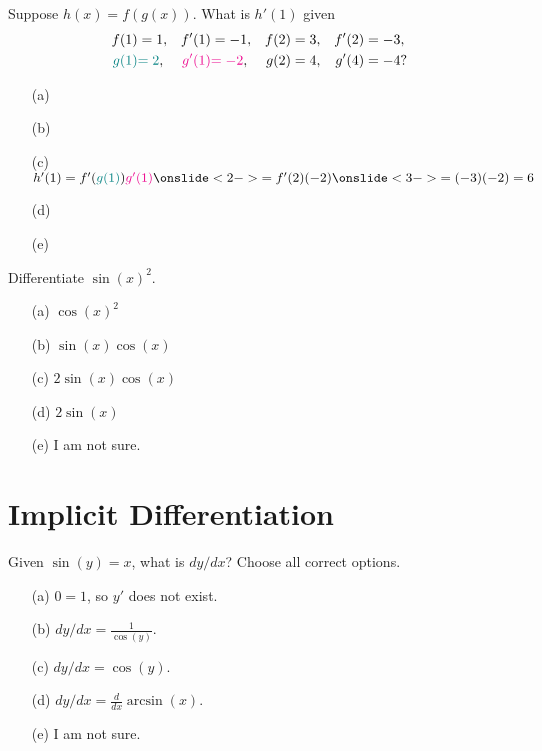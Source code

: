 \documentclass[14pt]{beamer}
\begin{document}
\begin{frame}
  Suppose \(h(x) = f(g(x))\). What is \(h'(1)\) given
  \begin{align*}
    f(1) &= 1,& f'(1) &= -1, &f(2) &= 3, & f'(2) &= -3, \\
    {\color{teal}g(1)} &{\color{teal}= 2},& {\color{magenta}g'(1)} &{\color{magenta}= -2}, &g(2) &= 4, & g'(4) &= -4?
  \end{align*}

  \medskip
  \begin{itemize} \setlength\itemsep{2ex}
    \item[(a)] 
    \item[(b)] 
    \item[(c)] \(h'(1) = f'({\color{teal}g(1)}){\color{magenta}g'(1)} \onslide<2->{= f'(2)(-2)} \onslide<3->{= (-3)(-2) = 6}\)
    \item[(d)] 
    \item[(e)] 
  \end{itemize} 
\end{frame}
\begin{frame}
  Differentiate \(\sin(x)^{2}\).

  \medskip
  \begin{itemize} \setlength\itemsep{2ex}
    \item[(a)] \(\cos(x)^{2}\)
    \item[(b)] \(\sin(x)\cos(x)\)
    \item[(c)] \(2\sin(x)\cos(x)\)
    \item[(d)] \(2\sin(x)\)
    \item[(e)] I am not sure.
  \end{itemize} 
\end{frame}


\section{Implicit Differentiation}
\begin{frame}
  Given \(\sin(y) = x\), what is \(dy/dx\)? Choose all correct options.

  \medskip
  \begin{itemize} \setlength\itemsep{2ex}
    \item[(a)] \(0 = 1\), so \(y'\) does not exist.
    \item[(b)] \(dy/dx = \tfrac{1}{\cos(y)}\).
    \item[(c)] \(dy/dx = \cos(y)\).
    \item[(d)] \(dy/dx = \tfrac{d}{dx} \arcsin(x)\).
    \item[(e)] I am not sure.
  \end{itemize} 
\end{frame}
\end{document}
